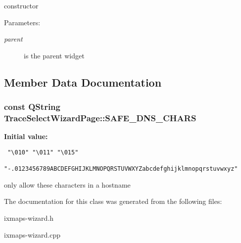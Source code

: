 constructor \begin{Desc}
\item[Parameters:]
\begin{description}
\item[{\em parent}]is the parent widget \end{description}
\end{Desc}


\subsection{Member Data Documentation}
\hypertarget{classTraceSelectWizardPage_ecea06bd0ef463ee341d1dab45b94ecf}{
\subsubsection[SAFE\_\-DNS\_\-CHARS]{\setlength{\rightskip}{0pt plus 5cm}const QString {\bf TraceSelectWizardPage::SAFE\_\-DNS\_\-CHARS}}}
\label{classTraceSelectWizardPage_ecea06bd0ef463ee341d1dab45b94ecf}


\textbf{Initial value:}

\begin{Code}\begin{verbatim} "\010" "\011" "\015"
      "-.0123456789ABCDEFGHIJKLMNOPQRSTUVWXYZabcdefghijklmnopqrstuvwxyz"
\end{verbatim}
\end{Code}
only allow these characters in a hostname 



The documentation for this class was generated from the following files:\begin{CompactItemize}
\item 
ixmaps-wizard.h\item 
ixmaps-wizard.cpp\end{CompactItemize}
